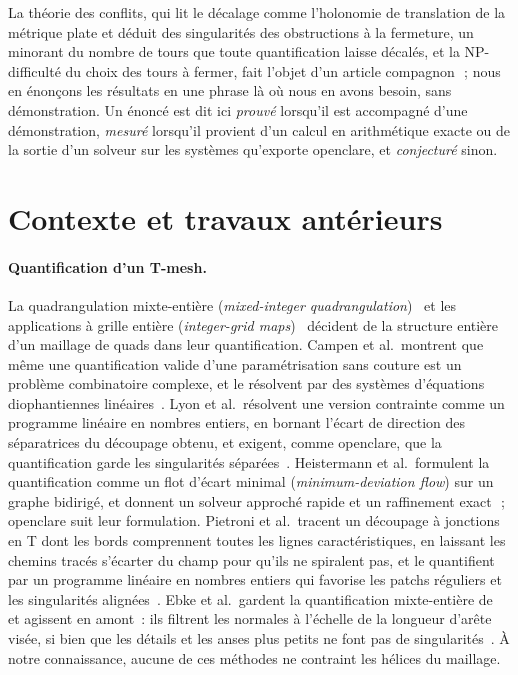 \documentclass[11pt,a4paper]{article}
\begin{document}
La théorie des conflits, qui lit le décalage comme l'holonomie de
translation de la métrique plate et déduit des singularités des obstructions
à la fermeture, un minorant du nombre de tours que toute quantification
laisse décalés, et la NP-difficulté du choix des tours à fermer, fait l'objet
d'un article compagnon~\cite{gardent2026turns}\,; nous en énonçons les
résultats en une phrase là où nous en avons besoin, sans démonstration. Un
énoncé est dit ici \emph{prouvé} lorsqu'il est accompagné d'une
démonstration, \emph{mesuré} lorsqu'il provient d'un calcul en arithmétique
exacte ou de la sortie d'un solveur sur les systèmes qu'exporte openclare, et
\emph{conjecturé} sinon.

\section{Contexte et travaux antérieurs}\label{sec:related}

\paragraph{Quantification d'un T-mesh.}
La quadrangulation mixte-entière (\emph{mixed-integer
quadrangulation})~\cite{bommes2009miq} et les applications à grille entière
(\emph{integer-grid maps})~\cite{bommes2013igm} décident de la structure
entière d'un maillage de quads dans leur quantification. Campen et al.\
montrent que même une quantification valide d'une paramétrisation sans
couture est un problème combinatoire complexe, et le résolvent par des
systèmes d'équations diophantiennes linéaires~\cite{campen2015qgp}. Lyon et al.\ résolvent
une version contrainte comme un programme linéaire en nombres entiers, en
bornant l'écart de direction des séparatrices du découpage obtenu, et
exigent, comme openclare, que la quantification garde les singularités
séparées~\cite{lyon2021constrained}. Heistermann et al.\ formulent la
quantification comme un flot d'écart minimal (\emph{minimum-deviation flow})
sur un graphe bidirigé, et donnent un solveur approché rapide et un
raffinement exact~\cite{heistermann2023bimdf}\,; openclare suit leur
formulation. Pietroni et al.\ tracent un découpage à jonctions en T dont les
bords comprennent toutes les lignes caractéristiques, en laissant les chemins
tracés s'écarter du champ pour qu'ils ne spiralent pas, et le quantifient par
un programme linéaire en nombres entiers qui favorise les patchs réguliers et
les singularités alignées~\cite{pietroni2021reliable}. Ebke et al.\ gardent la
quantification mixte-entière de~\cite{bommes2009miq} et agissent en amont~:
ils filtrent les normales à l'échelle de la longueur d'arête visée, si bien
que les détails et les anses plus petits ne font pas de
singularités~\cite{ebke2014lod}. À notre connaissance, aucune de ces méthodes
ne contraint les hélices du maillage.
\end{document}
